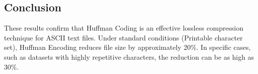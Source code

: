 \subsection{Conclusion}
These results confirm that Huffman Coding is an effective lossless compression technique for ASCII text files. Under standard conditions (Printable character set), Huffman Encoding reduces file size by approximately 20\%. In specific cases, such as datasets with highly repetitive characters, the reduction can be as high as 30\%.